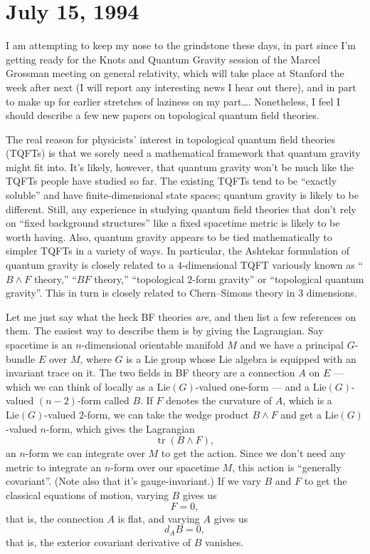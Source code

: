 \documentclass{article}
\begin{document}
\hypertarget{week36}{%
\section{July 15, 1994}\label{week36}}

I am attempting to keep my nose to the grindstone these days, in part
since I'm getting ready for the Knots and Quantum Gravity session of the
Marcel Grossman meeting on general relativity, which will take place at
Stanford the week after next (I will report any interesting news I hear
out there), and in part to make up for earlier stretches of laziness on
my part\ldots. Nonetheless, I feel I should describe a few new papers on
topological quantum field theories.

The real reason for physicists' interest in topological quantum field
theories (TQFTs) is that we sorely need a mathematical framework that
quantum gravity might fit into. It's likely, however, that quantum
gravity won't be much like the TQFTs people have studied so far. The
existing TQFTs tend to be ``exactly soluble'' and have
finite-dimensional state spaces; quantum gravity is likely to be
different. Still, any experience in studying quantum field theories that
don't rely on ``fixed background structures'' like a fixed spacetime
metric is likely to be worth having. Also, quantum gravity appears to be
tied mathematically to simpler TQFTs in a variety of ways. In
particular, the Ashtekar formulation of quantum gravity is closely
related to a \(4\)-dimensional TQFT variously known as ``\(B \wedge F\)
theory,'' ``\(BF\) theory,'' ``topological \(2\)-form gravity'' or
``topological quantum gravity''. This in turn is closely related to
Chern--Simons theory in 3 dimensions.

Let me just say what the heck BF theories \emph{are}, and then list a
few references on them. The easiest way to describe them is by giving
the Lagrangian. Say spacetime is an \(n\)-dimensional orientable
manifold \(M\) and we have a principal \(G\)-bundle \(E\) over \(M\),
where \(G\) is a Lie group whose Lie algebra is equipped with an
invariant trace on it. The two fields in BF theory are a connection
\(A\) on \(E\) --- which we can think of locally as a
\(\mathrm{Lie}(G)\)-valued one-form --- and a \(\mathrm{Lie}(G)\)-valued
\((n-2)\)-form called \(B\). If \(F\) denotes the curvature of \(A\),
which is a \(\mathrm{Lie}(G)\)-valued \(2\)-form, we can take the wedge
product \(B\wedge F\) and get a \(\mathrm{Lie}(G)\)-valued \(n\)-form,
which gives the Lagrangian \[\operatorname{tr}(B \wedge F),\] an
\(n\)-form we can integrate over \(M\) to get the action. Since we don't
need any metric to integrate an \(n\)-form over our spacetime \(M\),
this action is ``generally covariant''. (Note also that it's
gauge-invariant.) If we vary \(B\) and \(F\) to get the classical
equations of motion, varying \(B\) gives us \[F = 0,\] that is, the
connection \(A\) is flat, and varying \(A\) gives us \[d_A B = 0,\] that
is, the exterior covariant derivative of \(B\) vanishes.
\end{document}
